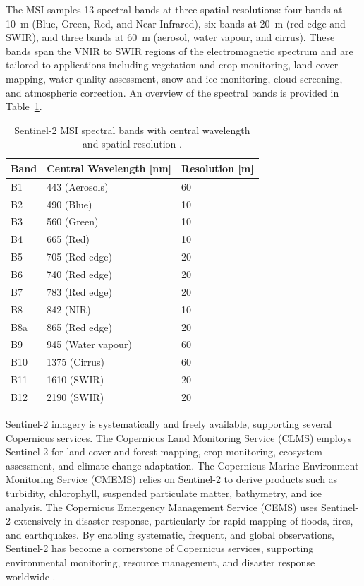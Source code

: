 The MSI samples 13 spectral bands at three spatial resolutions: four bands at 10~m (Blue, Green, Red, and Near-Infrared), six bands at 20~m (red-edge and SWIR), and three bands at 60~m (aerosol, water vapour, and cirrus). These bands span the VNIR to SWIR regions of the electromagnetic spectrum and are tailored to applications including vegetation and crop monitoring, land cover mapping, water quality assessment, snow and ice monitoring, cloud screening, and atmospheric correction. An overview of the spectral bands is provided in Table~\ref{tab:sentinel2_bands}.  

\begin{table}[h]
\centering
\caption[Sentinel-2 MSI spectral bands]{Sentinel-2 MSI spectral bands with central wavelength and spatial resolution \cite{sentiwiki}.}
\label{tab:sentinel2_bands}
\begin{tabular}{@{}lll@{}}
\toprule
\textbf{Band} & \textbf{Central Wavelength [nm]} & \textbf{Resolution [m]} \\ \midrule
B1  & 443  (Aerosols)                & 60 \\
B2  & 490  (Blue)                    & 10 \\
B3  & 560  (Green)                   & 10 \\
B4  & 665  (Red)                     & 10 \\
B5  & 705  (Red edge)                & 20 \\
B6  & 740  (Red edge)                & 20 \\
B7  & 783  (Red edge)                & 20 \\
B8  & 842  (NIR)                     & 10 \\
B8a & 865  (Red edge)                & 20 \\
B9  & 945  (Water vapour)            & 60 \\
B10 & 1375 (Cirrus)                  & 60 \\
B11 & 1610 (SWIR)                    & 20 \\
B12 & 2190 (SWIR)                    & 20 \\ \bottomrule
\end{tabular}
\end{table}

Sentinel-2 imagery is systematically and freely available, supporting several Copernicus services. The Copernicus Land Monitoring Service (CLMS) employs Sentinel-2 for land cover and forest mapping, crop monitoring, ecosystem assessment, and climate change adaptation. The Copernicus Marine Environment Monitoring Service (CMEMS) relies on Sentinel-2 to derive products such as turbidity, chlorophyll, suspended particulate matter, bathymetry, and ice analysis. The Copernicus Emergency Management Service (CEMS) uses Sentinel-2 extensively in disaster response, particularly for rapid mapping of floods, fires, and earthquakes. By enabling systematic, frequent, and global observations, Sentinel-2 has become a cornerstone of Copernicus services, supporting environmental monitoring, resource management, and disaster response worldwide \cite{sentiwiki}.  

